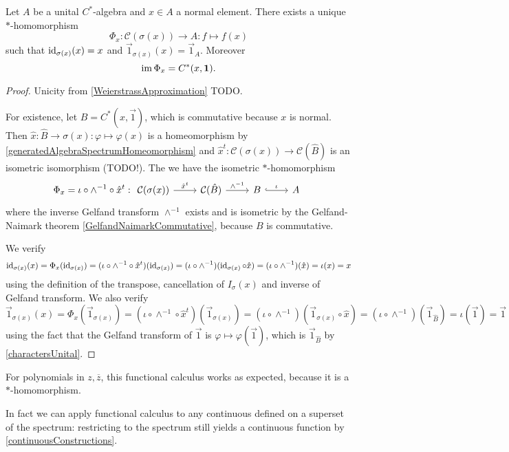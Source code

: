 \begin{theorem}
Let $A$ be a unital $C^*$-algebra and $x\in A$ a normal element. There exists a unique $*$-homomorphism
\[ \Phi_x: \mathcal{C}(\sigma(x))\to A: f\mapsto f(x) \]
such that $\operatorname{id}_{\sigma(x)}(x) = x$ and $\vec{1}_{\sigma(x)}(x) = \vec{1}_A$. Moreover
\[ \operatorname{im}\Phi_x = C^*(x,\boldsymbol{\mathrm{1}}). \]
\end{theorem}
\begin{proof}
Unicity from \ref{WeierstrassApproximation} TODO.

For existence, let $B = C^*(x,\vec{1})$, which is commutative because $x$ is normal. Then $\hat{x}: \hat{B}\to \sigma(x): \varphi\mapsto \varphi(x)$ is a homeomorphism by \ref{generatedAlgebraSpectrumHomeomorphism} and $\hat{x}^t: \mathcal{C}(\sigma(x))\to \mathcal{C}(\hat{B})$ is an isometric isomorphism (TODO!). The we have the isometric $*$-homomorphism
\[ \Phi_x = \iota\circ\wedge^{-1}\circ\hat{x}^t: \begin{tikzcd} \mathcal{C}(\sigma(x)) \ar[r, "\hat{x}^t"] & \mathcal{C}(\hat{B}) \ar[r, "\wedge^{-1}"] & B \ar[r , hook, "\iota"] & A \end{tikzcd} \]
where the inverse Gelfand transform $\wedge^{-1}$ exists and is isometric by the Gelfand-Naimark theorem \ref{GelfandNaimarkCommutative}, because $B$ is commutative.

We verify
\[ \operatorname{id}_{\sigma(x)}(x) = \Phi_x(\operatorname{id}_{\sigma(x)}) = (\iota\circ\wedge^{-1}\circ\hat{x}^t)(\operatorname{id}_{\sigma(x)}) = (\iota\circ\wedge^{-1})(\operatorname{id}_{\sigma(x)}\circ\hat{x}) = (\iota\circ\wedge^{-1})(\hat{x}) = \iota(x) = x \]
using the definition of the transpose, cancellation of $I_{\sigma}(x)$ and inverse of Gelfand transform. We also verify
\[ \vec{1}_{\sigma(x)}(x) = \Phi_x(\vec{1}_{\sigma(x)}) = (\iota\circ\wedge^{-1}\circ\hat{x}^t)(\vec{1}_{\sigma(x)}) = (\iota\circ\wedge^{-1})(\vec{1}_{\sigma(x)}\circ\hat{x}) = (\iota\circ\wedge^{-1})(\vec{1}_{\hat{B}}) = \iota(\vec{1}) = \vec{1} \]
using the fact that the Gelfand transform of $\vec{1}$ is $\varphi\mapsto \varphi(\vec{1})$, which is $\vec{1}_{\hat{B}}$ by \ref{charactersUnital}.
\end{proof}
For polynomials in $z,\overline{z}$, this functional calculus works as expected, because it is a $*$-homomorphism.

In fact we can apply functional calculus to any continuous defined on a superset of the spectrum: restricting to the spectrum still yields a continuous function by \ref{continuousConstructions}.

